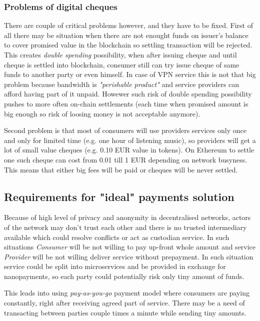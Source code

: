 \documentclass[a4paper,12pt]{article}
\begin{document}
\subsubsection{Problems of digital cheques}

There are couple of critical problems however, and they have to be fixed. First 
of all there may be situation when there are not enought funds on issuer's 
balance to cover promised value in the blockchain so settling transaction will 
be rejected. This creates \textit{double spending} possibility, when after 
issuing cheque and until cheque is settled into blockchain, consumer still can 
try issue cheque of same funds to another party or even himself. In case of VPN 
service this is not that big problem because bandwidth is \textit{"perishable 
product"} and service providers can afford having part of it unpaid. Howewer 
such risk of double spending possibility pushes to more often on-chain 
settlements (each time when promised amount is big enough so risk of loosing 
money is not acceptable anymore).

Second problem is that most of consumers will use providers services only once 
and only for limited time (e.g. one hour of listening music), so providers will 
get a lot of small value cheques (e.g. 0.10 EUR value in tokens). On Ethereum 
to settle one such cheque can cost from 0.01 till 1 EUR depending on network 
busyness. This means that either big fees will be paid or cheques will be never 
settled.

\subsection{Requirements for "ideal" payments solution}

Because of high level of privacy and anonymity in decentralised networks, actors
of the network may don’t trust each other and there is no trusted intermediary 
available which could resolve conflicts or act as custodian service. In such 
situations \textit{Consumer} will be not willing to pay up-front whole amount 
and service \textit{Provider} will be not willing deliver service without 
prepayment. In such situation service could be split into microservices and be 
provided in exchange for nanopayments, so each party could potentially risk only 
tiny amount of funds. 

This leads into using \textit{pay-as-you-go} payment model where consumers are 
paying constantly, right after receiving agreed part of service. There may be a 
need of transacting between parties couple times a minute while sending tiny 
amounts.
\end{document}
